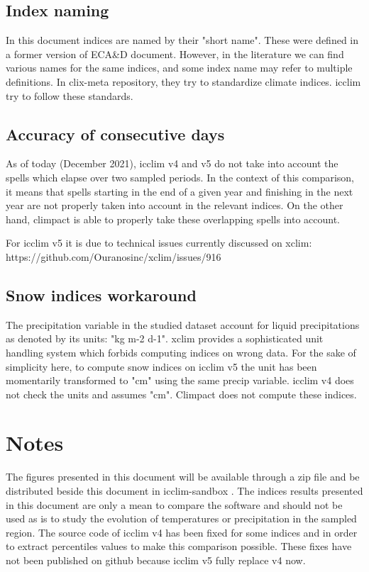 \documentclass[a4paper,11pt]{article}
\begin{document}
        \subsection{Index naming}
            In this document indices are named by their "short name". These were defined in a former version of ECA\&D document\cite{doc/ecad_old}.
            However, in the literature we can find various names for the same indices, and some index name may refer to multiple definitions. In clix-meta\cite{gh/clixmeta} repository, they try to standardize climate indices. 
            icclim try to follow these standards.

        \subsection{Accuracy of consecutive days}
            As of today (December 2021), icclim v4 and v5 do not take into account the spells which elapse over two sampled periods. In the context of this comparison, it means that spells starting in the end of a given year and finishing in the next year are not properly taken into account in the relevant indices.
            On the other hand, climpact is able to properly take these overlapping spells into account.

            For icclim v5 it is due to technical issues currently discussed on xclim: https://github.com/Ouranosinc/xclim/issues/916

        \subsection{Snow indices workaround}
            The precipitation variable in the studied dataset account for liquid precipitations as denoted by its units: "kg m-2 d-1".
            xclim provides a sophisticated unit handling system which forbids computing indices on wrong data. For the sake of simplicity here, to compute snow indices on icclim v5 the unit has been momentarily transformed to "cm" using the same precip variable.
            icclim v4 does not check the units and assumes "cm".
            Climpact does not compute these indices.
            
    \section{Notes}
        The figures presented in this document will be available through a zip file and be distributed beside this document in icclim-sandbox \cite{gh/icclim_sandbox}.
        The indices results presented in this document are only a mean to compare the software and should not be used as is to study the evolution of temperatures or precipitation in the sampled region.
        The source code of icclim v4 has been fixed for some indices and in order to extract percentiles values to make this comparison possible. These fixes have not been published on github because icclim v5 fully replace v4 now.
\end{document}
